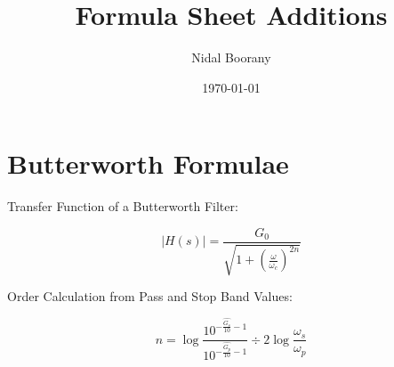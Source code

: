 \documentclass{article}
\begin{document}
\title{Formula Sheet Additions}
\author{Nidal Boorany}
\date{\today}
\maketitle

\section{Butterworth Formulae}
Transfer Function of a Butterworth Filter:

$$|H(s)| = \frac{G_0}{\sqrt{1 + (\frac{\omega}{\omega_c})^{2n}}}$$

Order Calculation from Pass and Stop Band Values:

$$n = \log{\frac{10^{- \frac{\hat{G_s}}{10} - 1}}{10^{- \frac{\hat{G_p}}{ 10} - 1}}} \div {2 \log{\frac{\omega_s}{\omega_p}}}$$
\end{document}
